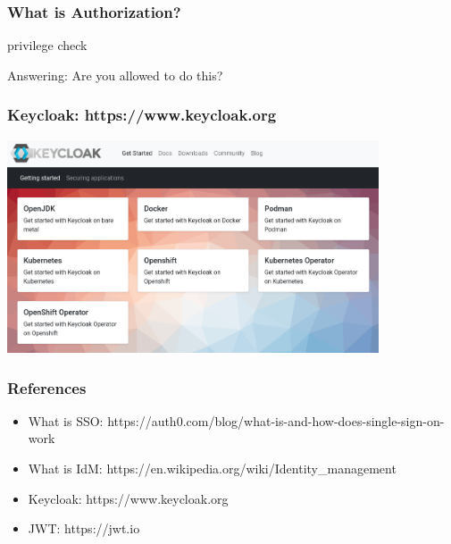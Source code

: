\documentclass{beamer}
\begin{document}
\begin{frame}
  \frametitle{What is Authorization?}

  privilege check

  \bigskip

  Answering: Are you allowed to do this?
\end{frame}

\begin{frame}
  \frametitle{Keycloak: https://www.keycloak.org}
    \includegraphics[width=11cm]{install}
\end{frame}

\begin{frame}
  \frametitle{References}

  \begin{itemize}
    \item What is SSO: https://auth0.com/blog/what-is-and-how-does-single-sign-on-work
    \item What is IdM: https://en.wikipedia.org/wiki/Identity\_management
    \medskip
    \item Keycloak: https://www.keycloak.org
    \item JWT: https://jwt.io
  \end{itemize}
\end{frame}
\end{document}
